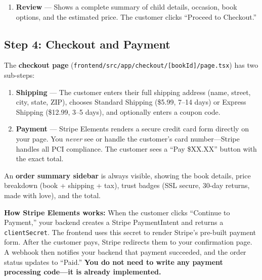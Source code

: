 \documentclass[12pt, letterpaper, oneside]{book}
\begin{document}
\begin{enumerate}[leftmargin=2em]
\begin{itemize}[leftmargin=1.5em]
      \item Page count (12, 24, or 36 pages)
      \item Illustration style (Full Color or Black \& White Coloring Book)
      \item Binding (Softcover, Hardcover +\$10, Saddle Stitch)
      \item Paper (Standard, Premium Matte +\$5, Glossy +\$8)
      \item Book size (8''$\times$8'' Square, 8.5''$\times$11'' Portrait +\$3, 11''$\times$8.5'' Landscape +\$3)
      \item Add-ons (Audiobook +\$9.99, Digital PDF +\$4.99, Gift Wrap +\$3.99)
    \end{itemize}
    A \textbf{live price estimate} updates in real time at the top of the page as the customer selects options. Incompatible combinations (e.g., hardcover + landscape) show validation warnings and prevent checkout.
  \item \textbf{Review} --- Shows a complete summary of child details, occasion, book options, and the estimated price. The customer clicks ``Proceed to Checkout.''
\end{enumerate}

\subsection*{Step 4: Checkout and Payment}
The \textbf{checkout page} (\texttt{frontend/src/app/checkout/[bookId]/page.tsx}) has two sub-steps:

\begin{enumerate}[leftmargin=2em]
  \item \textbf{Shipping} --- The customer enters their full shipping address (name, street, city, state, ZIP), chooses Standard Shipping (\$5.99, 7--14 days) or Express Shipping (\$12.99, 3--5 days), and optionally enters a coupon code.
  \item \textbf{Payment} --- Stripe Elements renders a secure credit card form directly on your page. You \textit{never} see or handle the customer's card number---Stripe handles all PCI compliance. The customer sees a ``Pay \$XX.XX'' button with the exact total.
\end{enumerate}

An \textbf{order summary sidebar} is always visible, showing the book details, price breakdown (book + shipping + tax), trust badges (SSL secure, 30-day returns, made with love), and the total.

\begin{infobox}
\textbf{How Stripe Elements works:} When the customer clicks ``Continue to Payment,'' your backend creates a Stripe PaymentIntent and returns a \texttt{clientSecret}. The frontend uses this secret to render Stripe's pre-built payment form. After the customer pays, Stripe redirects them to your confirmation page. A webhook then notifies your backend that payment succeeded, and the order status updates to ``Paid.'' \textbf{You do not need to write any payment processing code---it is already implemented.}
\end{infobox}
\end{document}
